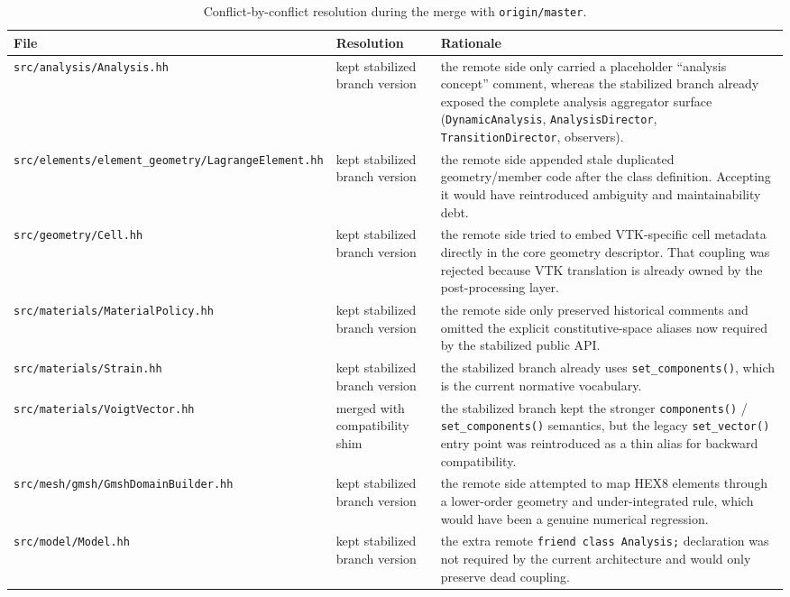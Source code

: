 \begin{table}[htb]
\centering
\small
\begin{tabular}{p{}p{}p{}}
\toprule
File & Resolution & Rationale \\
\midrule
\texttt{src/analysis/Analysis.hh} &
kept stabilized branch version &
the remote side only carried a placeholder ``analysis concept'' comment,
whereas the stabilized branch already exposed the complete analysis aggregator
surface (\texttt{DynamicAnalysis}, \texttt{AnalysisDirector},
\texttt{TransitionDirector}, observers). \\
\texttt{src/elements/element\_geometry/LagrangeElement.hh} &
kept stabilized branch version &
the remote side appended stale duplicated geometry/member code after the class
definition.  Accepting it would have reintroduced ambiguity and maintainability
debt. \\
\texttt{src/geometry/Cell.hh} &
kept stabilized branch version &
the remote side tried to embed VTK-specific cell metadata directly in the core
geometry descriptor.  That coupling was rejected because VTK translation is
already owned by the post-processing layer. \\
\texttt{src/materials/MaterialPolicy.hh} &
kept stabilized branch version &
the remote side only preserved historical comments and omitted the explicit
constitutive-space aliases now required by the stabilized public API. \\
\texttt{src/materials/Strain.hh} &
kept stabilized branch version &
the stabilized branch already uses \texttt{set\_components()}, which is the
current normative vocabulary. \\
\texttt{src/materials/VoigtVector.hh} &
merged with compatibility shim &
the stabilized branch kept the stronger \texttt{components()} /
\texttt{set\_components()} semantics, but the legacy \texttt{set\_vector()}
entry point was reintroduced as a thin alias for backward compatibility. \\
\texttt{src/mesh/gmsh/GmshDomainBuilder.hh} &
kept stabilized branch version &
the remote side attempted to map HEX8 elements through a lower-order geometry
and under-integrated rule, which would have been a genuine numerical
regression. \\
\texttt{src/model/Model.hh} &
kept stabilized branch version &
the extra remote \texttt{friend class Analysis;} declaration was not required
by the current architecture and would only preserve dead coupling. \\
\bottomrule
\end{tabular}
\caption{Conflict-by-conflict resolution during the merge with \texttt{origin/master}.}
\label{tab:ms-stab-merge-conflicts}
\end{table}

